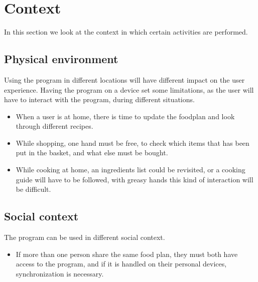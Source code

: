 \section{Context}
In this section we look at the context in which certain activities are performed.

\subsection{Physical environment}
Using the program in different locations will have different impact on the user experience. Having the program on a device set some limitations, as the user will have to interact with the program, during different situations.
\begin{itemize}
\item When a user is at home, there is time to update the foodplan and look through different recipes.
\item While shopping, one hand must be free, to check which items that has been put in the basket, and what else must be bought.
\item While cooking at home, an ingredients list could be revisited, or a cooking guide will have to be followed, with greasy hands this kind of interaction will be difficult.
\end{itemize}

\subsection{Social context}
The program can be used in different social context.
\begin{itemize}
\item If more than one person share the same food plan, they must both have access to the program, and if it is handled on their personal devices, synchronization is necessary.
\end{itemize}

